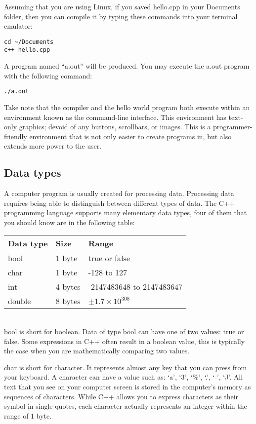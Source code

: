 \documentclass[a4paper,12pt]{article}
\begin{document}
Assuming that you are using Linux, if you saved hello.cpp in your Documents folder, then you can compile it by typing these commands into your terminal emulator:
\begin{lstlisting}
cd ~/Documents
c++ hello.cpp
\end{lstlisting}
A program named ``a.out'' will be produced.  You may execute the a.out program with the following command:
\begin{lstlisting}
./a.out
\end{lstlisting}

Take note that the compiler and the hello world program both execute within an environment known as the command-line interface. This environment has text-only graphics; devoid of any buttons, scrollbars, or images. This is a programmer-friendly environment that is not only easier to create programs in, but also extends more power to the user. 

\subsection*{Data types}

A computer program is usually created for processing data. Processing data requires being able to distinguish between different types of data. The C++ programming language supports many elementary data types, four of them that you should know are in the following table: \\

\begin{tabular}{|l|l|l|}
\hline
{\bf Data type} & {\bf Size} & {\bf Range} \\
\hline
bool & 1 byte & true or false \\
\hline
char & 1 byte & -128 to 127 \\
\hline
int & 4 bytes & -2147483648 to 2147483647 \\
\hline
double & 8 bytes & $\pm1.7 \times 10^{308}$ \\
\hline
\end{tabular} \\

bool is short for boolean. Data of type bool can have one of two values: true or false. Some expressions in C++ often result in a boolean value, this is typically the case when you are mathematically comparing two values.

char is short for character. It represents almost any key that you can press from your keyboard. A character can have a value such as: `a', `3', `\%', `.', ` ', `J'. All text that you see on your computer screen is stored in the computer's memory as sequences of characters. While C++ allows you to express characters as their symbol in single-quotes, each character actually represents an integer within the range of 1 byte.
\end{document}
